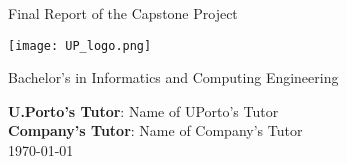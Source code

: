 \begin{titlepage}
\begin{center}

\vspace*{1cm}
{\fontsize{17}{16}\selectfont \textbf{\projecttitle}}

\vspace{0.5cm}
Final Report of the Capstone Project

\vspace{1.5cm}
\textbf{\studentname}
\vfill

\texttt{[image: UP\_logo.png]}
\vfill

Bachelor's in Informatics and Computing Engineering
\vspace{0.8cm}

\textbf{U.Porto's Tutor}: Name of UPorto's Tutor\\
\textbf{Company's Tutor}: Name of Company's Tutor \\

\vspace{0.4cm}
\monthyear \today

\end{center}
\end{titlepage}